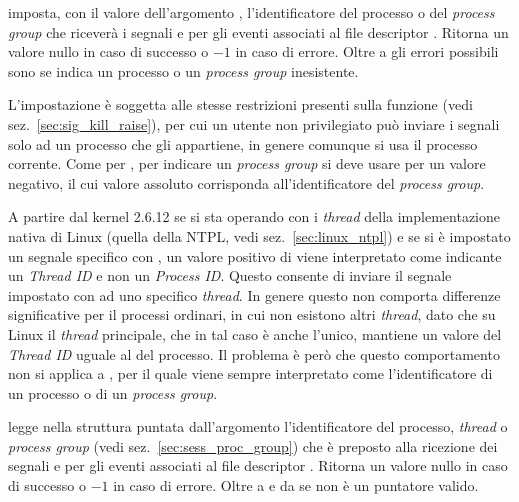 \begin{basedescript}{\desclabelwidth{1.8cm}}
\item[\constd{F\_SETOWN}] imposta, con il valore dell'argomento ,
  l'identificatore del processo o del \textit{process group} che riceverà i
  segnali  e  per gli eventi associati al file
  descriptor . Ritorna un valore nullo in caso di successo o $-1$ in
  caso di errore. Oltre a  gli errori possibili sono
   se  indica un processo o un \textit{process
    group} inesistente.

  L'impostazione è soggetta alle stesse restrizioni presenti sulla funzione
   (vedi sez.~\ref{sec:sig_kill_raise}), per cui un utente non
  privilegiato può inviare i segnali solo ad un processo che gli appartiene,
  in genere comunque si usa il processo corrente.  Come per ,
  per indicare un \textit{process group} si deve usare per  un
  valore negativo, il cui valore assoluto corrisponda all'identificatore del
  \textit{process group}.

  A partire dal kernel 2.6.12 se si sta operando con i \textit{thread} della
  implementazione nativa di Linux (quella della NTPL, vedi
  sez.~\ref{sec:linux_ntpl}) e se si è impostato un segnale specifico con
  , un valore positivo di  viene interpretato come
  indicante un \textit{Thread ID} e non un \textit{Process ID}.  Questo
  consente di inviare il segnale impostato con  ad uno
  specifico \textit{thread}. In genere questo non comporta differenze
  significative per il processi ordinari, in cui non esistono altri
  \textit{thread}, dato che su Linux il \textit{thread} principale, che in tal
  caso è anche l'unico, mantiene un valore del \textit{Thread ID} uguale al
   del processo. Il problema è però che questo comportamento non si
  applica a , per il quale  viene sempre
  interpretato come l'identificatore di un processo o di un \textit{process
    group}.

\item[\constd{F\_GETOWN\_EX}] legge nella struttura puntata
  dall'argomento  l'identificatore del processo, \textit{thread}
  o \textit{process group} (vedi sez.~\ref{sec:sess_proc_group}) che è
  preposto alla ricezione dei segnali  e  per gli
  eventi associati al file descriptor .  Ritorna un valore nullo in
  caso di successo o $-1$ in caso di errore. Oltre a  e da
   se  non è un puntatore valido.


\end{basedescript}
